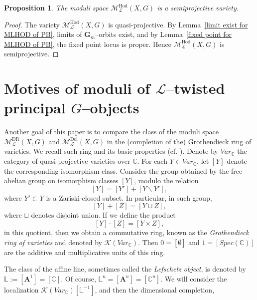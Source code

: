 \documentclass[12pt,reqno]{amsart}
\numberwithin{equation}{subsection}
\newtheorem{proposition}[equation]{Proposition}
\theoremstyle{definition}
\theoremstyle{theorem}
\begin{document}
 
\begin{proposition}\label{semiprojectivity of MLHOD(X,G)}
	The moduli space
	$\mathcal{M}^{\mathrm{Hod}}_{\mathcal{L}}(X,G)$
	is a semiprojective variety.
\end{proposition}

\begin{proof}
	The variety $\mathcal{M}^{\mathrm{Hod}}_{\mathcal{L}}(X,G)$ is
	quasi-projective.
	By Lemma~\eqref{limit exist for MLHOD of PB}, limits of $\mathbf{G}_{m}$--orbits
	exist, and by Lemma~\eqref{fixed point for MLHOD of PB}, the fixed point locus
	is proper.
	Hence $\mathcal{M}^{\mathrm{Hod}}_{\mathcal{L}}(X,G)$ is semiprojective.
\end{proof}


\section{Motives of moduli of $\mathcal{L}$--twisted principal $G$--objects}

Another goal of this paper is to compare the class of the moduli space $\mathcal{M}^{\text{DR}}_{\mathcal{L}}(X,G)$ and $\mathcal{M}^{\text{Dol}}_{\mathcal{L}}(X,G)$ in the (completion of the)
Grothendieck ring of varieties. We recall such ring and its basic properties (cf. \cite[\S\,5]{Alfaya-Oliveire-2024}).
Denote by $Var_{\mathbb{C}}$ the category of quasi-projective varieties over $\mathbb{C}$. For each $Y \in Var_{\mathbb{C}}$, let $[Y]$ denote the corresponding isomorphism class. Consider the group obtained by the free abelian group on isomorphism classes $[Y]$, modulo the relation
\[[Y] = [Y'] + [Y \backslash Y'],\]
where $Y' \subset Y$ is a Zariski-closed subset. In particular, in such group,
\[[Y] + [Z] = [Y \sqcup Z],\]
where $\sqcup$ denotes disjoint union. If we define the product
\[[Y] \cdot [Z] = [Y \times Z],\]
in this quotient, then we obtain a commutative ring, known as the \textit{Grothendieck ring of varieties} and denoted by $\mathcal{K}(Var_{\mathbb{C}})$.
Then $0 = [\emptyset]$ and $1 = [Spec(\mathbb{C})]$ are the additive and multiplicative units of this ring. 

The class of the affine line, sometimes called the \textit{Lefschetz object}, is denoted by $\mathbb{L} := [\mathbf{A}^{1}] = [\mathbb{C}]$.
Of course, $\mathbb{L}^{n} = [\mathbf{A}^{n}] = [\mathbb{C}^{n}]$. We will consider the localization $\mathcal{K}(Var_{\mathbb{C}})[\mathbb{L}^{-1}]$, and then the dimensional completion,
\end{document}
